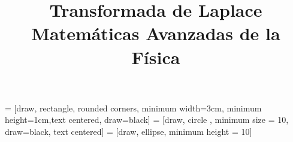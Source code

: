 \usepackage{standalone}

\usepackage{mathrsfs}
\usepackage{bigints}
\usepackage{tikz}
\usetikzlibrary{decorations.pathmorphing,patterns}
\usetikzlibrary{shapes.geometric, arrows}
 = [draw, rectangle, rounded corners, minimum width=3cm, minimum height=1cm,text centered, draw=black]
 = [draw, circle , minimum size = 10, draw=black, text centered]
 = [draw, ellipse, minimum height = 10]
\usepackage{pgfplots}
\usepackage{float}
\newtheorem{defi}{{\textit{Definición}}}[section]
\newtheorem{teo}{{\textit{Teorema}}}[section]
\newtheorem{cor}{Corolario}
\newcommand{\saltosin}{\nonumber \\}
\title{Transformada de Laplace \\ {\large Matemáticas Avanzadas de la Física}}
\date{ }

\renewcommand\labelenumii{\theenumi.{\arabic{enumii}}}
\maketitle
\fontsize{14}{14}\selectfont
